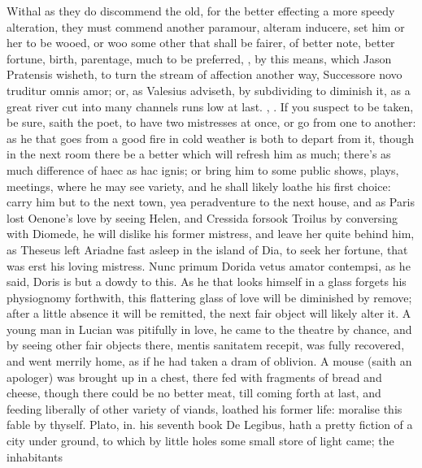 {Withal as they do discommend the old, for the better effecting a more
speedy alteration, they must commend another paramour, alteram
inducere, set him or her to be wooed, or woo some other that shall be
fairer, of better note, better fortune, birth, parentage, much to be
preferred, , by this
means, which Jason Pratensis wisheth, to turn the stream of affection
another way, Successore novo truditur omnis amor; or, as Valesius
adviseth, by subdividing to diminish it, as a great river cut
into many channels runs low at last. , \etc{}. If you suspect to be taken, be sure, saith the
poet, to have two mistresses at once, or go from one to another: as he
that goes from a good fire in cold weather is both to depart from it,
though in the next room there be a better which will refresh him as
much; there's as much difference of haec as hac ignis; or bring him to
some public shows, plays, meetings, where he may see variety, and he
shall likely loathe his first choice: carry him but to the next town,
yea peradventure to the next house, and as Paris lost Oenone's love by
seeing Helen, and Cressida forsook Troilus by conversing with Diomede,
he will dislike his former mistress, and leave her quite behind him, as
Theseus left Ariadne fast asleep in the island of Dia, to seek
her fortune, that was erst his loving mistress. Nunc primum
Dorida vetus amator contempsi, as he said, Doris is but a dowdy to
this. As he that looks himself in a glass forgets his physiognomy
forthwith, this flattering glass of love will be diminished by remove;
after a little absence it will be remitted, the next fair object will
likely alter it. A young man in Lucian was pitifully in love, he
came to the theatre by chance, and by seeing other fair objects there,
mentis sanitatem recepit, was fully recovered,  and went merrily
home, as if he had taken a dram of oblivion. A mouse (saith an
apologer) was brought up in a chest, there fed with fragments of bread
and cheese, though there could be no better meat, till coming forth at
last, and feeding liberally of other variety of viands, loathed his
former life: moralise this fable by thyself. Plato, in. his seventh
book De Legibus, hath a pretty fiction of a city under ground, to
which by little holes some small store of light came; the inhabitants
}
